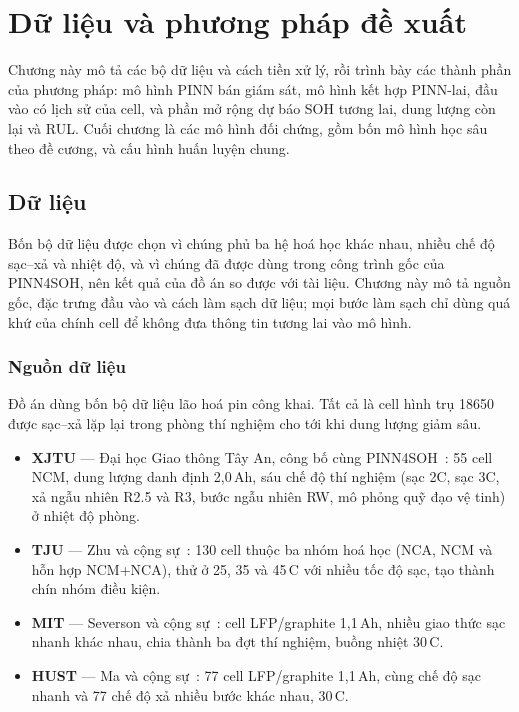 \documentclass[12pt,a4paper,oneside]{report}
\theoremstyle{plain}
\theoremstyle{definition}
\begin{document}
\chapter{Dữ liệu và phương pháp đề xuất}\label{ch:dulieu}\label{ch:phuongphap}

Chương này mô tả các bộ dữ liệu và cách tiền xử lý, rồi trình bày các thành phần của phương pháp: mô hình PINN bán
giám sát, mô hình kết hợp PINN-lai, đầu vào có lịch sử của cell, và phần mở rộng dự báo SOH tương lai, dung lượng còn
lại và RUL. Cuối chương là các mô hình đối chứng, gồm bốn mô hình học sâu theo đề cương, và cấu hình huấn luyện chung.
\section{Dữ liệu}\label{sec:data}


Bốn bộ dữ liệu được chọn vì chúng phủ ba hệ hoá học khác nhau, nhiều chế độ sạc--xả và nhiệt độ, và vì chúng đã
được dùng trong công trình gốc của PINN4SOH, nên kết quả của đồ án so được với tài liệu. Chương này mô tả nguồn
gốc, đặc trưng đầu vào và cách làm sạch dữ liệu; mọi bước làm sạch chỉ dùng quá khứ của chính cell để không đưa
thông tin tương lai vào mô hình.

\subsection{Nguồn dữ liệu}

Đồ án dùng bốn bộ dữ liệu lão hoá pin công khai. Tất cả là cell hình trụ 18650 được sạc--xả lặp lại trong
phòng thí nghiệm cho tới khi dung lượng giảm sâu.

\begin{itemize}
\item \textbf{XJTU} --- Đại học Giao thông Tây An, công bố cùng PINN4SOH~\cite{wang2024}: 55 cell NCM, dung
      lượng danh định 2,0\,Ah, sáu chế độ thí nghiệm (sạc 2C, sạc 3C, xả ngẫu nhiên R2.5 và R3, bước ngẫu nhiên
      RW, mô phỏng quỹ đạo vệ tinh) ở nhiệt độ phòng.
\item \textbf{TJU} --- Zhu và cộng sự~\cite{zhu2022}: 130 cell thuộc ba nhóm hoá học (NCA, NCM và hỗn hợp
      NCM+NCA), thử ở 25, 35 và 45\,\textdegree C với nhiều tốc độ sạc, tạo thành chín nhóm điều kiện.
\item \textbf{MIT} --- Severson và cộng sự~\cite{severson2019}: cell LFP/graphite 1,1\,Ah, nhiều giao thức sạc
      nhanh khác nhau, chia thành ba đợt thí nghiệm, buồng nhiệt 30\,\textdegree C.
\item \textbf{HUST} --- Ma và cộng sự~\cite{ma2022}: 77 cell LFP/graphite 1,1\,Ah, cùng chế độ sạc nhanh và 77
      chế độ xả nhiều bước khác nhau, 30\,\textdegree C.
\end{itemize}
\end{document}
